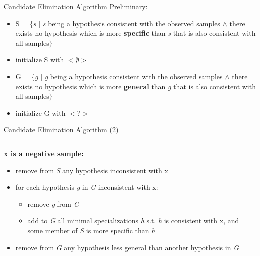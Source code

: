 \documentclass{beamer}
\begin{document}
\begin{frame}{Candidate Elimination Algorithm}
Preliminary:
\begin{itemize}
\item S = $\{$\emph{s} | \emph{s} being a hypothesis consistent with the observed samples $\land$ there exists no hypothesis which is more \textbf{specific} than \emph{s} that is also consistent with all samples$\}$
\item initialize S with $<\emptyset>$ 
\item G = $\{$\emph{g} | \emph{g} being a hypothesis consistent with the observed samples $\land$ there exists no hypothesis which is more \textbf{general} than \emph{g} that is also consistent with all samples$\}$
\item initialize G with $<?>$
\end{itemize}
\end{frame}


\begin{frame}{Candidate Elimination Algorithm (2)}

\begin{columns}
\begin{column}{0.5\textwidth}
\textbf{\color{brown}x is a negative sample:}
\begin{itemize}
\item remove from \emph{S} any hypothesis inconsistent with x
\item for each hypothesis \emph{g} in \emph{G} inconsistent with x: 
  \begin{itemize}
  \item remove \emph{g} from \emph{G} 
  \item add to \emph{G} all minimal specializations \emph{h} s.t. \emph{h} is consistent with x, and some member of \emph{S} is more specific than \emph{h}
  \end{itemize}
\item remove from \emph{G} any hypothesis less general than another hypothesis in \emph{G}
\end{itemize}	
\end{column}
\begin{column}{0.5\textwidth}
\end{column}
\end{columns}

\end{frame}
\end{document}
